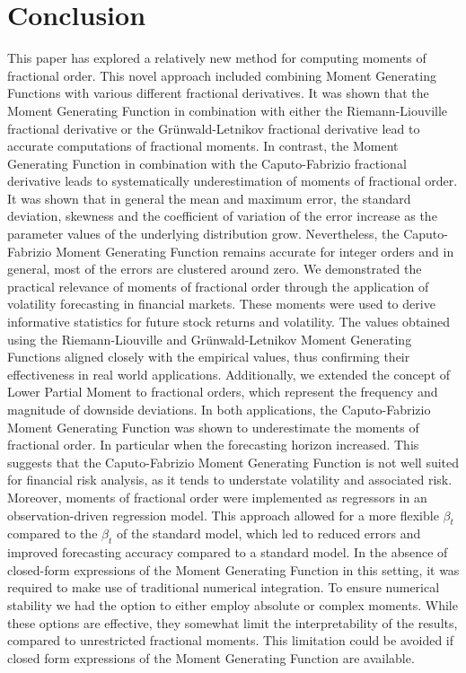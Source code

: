 \section{Conclusion}\label{s:con}
This paper has explored a relatively new method for computing moments of fractional order. This novel approach included combining Moment Generating Functions with various different fractional derivatives. It was shown that the Moment Generating Function in combination with either the Riemann-Liouville fractional derivative or the Grünwald-Letnikov fractional derivative lead to accurate computations of fractional moments. In contrast, the Moment Generating Function in combination with the Caputo-Fabrizio fractional derivative leads to systematically underestimation of moments of fractional order.
\newline
It was shown that in general the mean and maximum error, the standard deviation, skewness and the coefficient of variation of the error increase as the parameter values of the underlying distribution grow. Nevertheless, the Caputo-Fabrizio Moment Generating Function remains accurate for integer orders and in general, most of the errors are clustered around zero. 
\newline
We demonstrated the practical relevance of moments of fractional order through the application of volatility forecasting in financial markets. These moments were used to derive informative statistics for future stock returns and volatility. The values obtained using the Riemann-Liouville and Grünwald-Letnikov Moment Generating Functions aligned closely with the empirical values, thus confirming their effectiveness in real world applications.
\newline
Additionally, we extended the concept of Lower Partial Moment to fractional orders, which represent the frequency and magnitude of downside deviations. In both applications, the Caputo-Fabrizio Moment Generating Function was shown to underestimate the moments of fractional order. In particular when the forecasting horizon increased. This suggests that the Caputo-Fabrizio Moment Generating Function is not well suited for financial risk analysis, as it tends to understate volatility and associated risk. 
\newline
Moreover, moments of fractional order were implemented as regressors in an observation-driven regression model. This approach allowed for a more flexible \(\beta_t\) compared to the \(\beta_t\) of the standard model, which led to reduced errors and improved forecasting accuracy compared to a standard model. In the absence of closed-form expressions of the Moment Generating Function in this setting, it was required to make use of traditional numerical integration. To ensure numerical stability we had the option to either employ absolute or complex moments. While these options are effective, they somewhat limit the interpretability of the results, compared to unrestricted fractional moments. This limitation could be avoided if closed form expressions of the Moment Generating Function are available.
\newline

